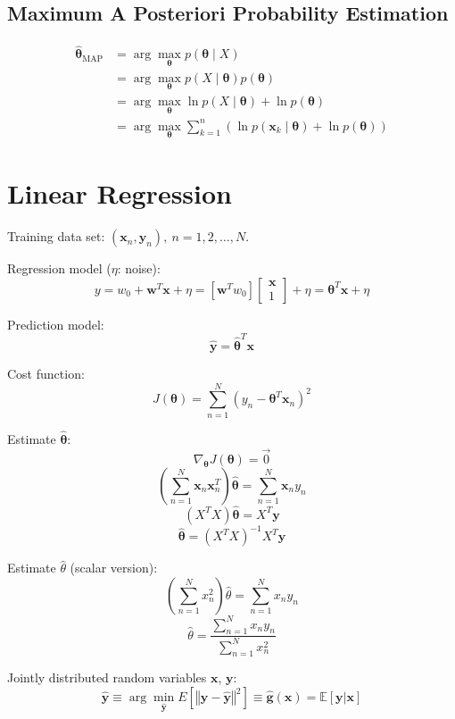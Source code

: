 \documentclass{article}
\begin{document}
\begin{multicols}{2}
\subsection{Maximum A Posteriori Probability Estimation}

\[\begin{split}
	\symbf{\hat \theta}_{\text{MAP}} &= \arg\max_{\symbf{\theta}} p(\symbf{\theta} \mid X) \\
	&= \arg\max_{\symbf{\theta}} p(X \mid \symbf{\theta}) p(\symbf{\theta}) \\
	&= \arg\max_{\symbf{\theta}} \ln p(X \mid \symbf{\theta}) + \ln p(\symbf{\theta}) \\
	&= \arg\max_{\symbf{\theta}} \sum_{k=1}^n \left( \ln p(\symbf{x}_k \mid \symbf{\theta}) + \ln p(\symbf{\theta}) \right)
\end{split}\]


\section{Linear Regression}

Training data set: $(\symbf{x}_n, \symbf{y}_n),\ n=1, 2, \ldots, N$.

Regression model ($\eta$: noise):
\[y = w_0 + \symbf{w}^T \symbf{x} + \eta = [\symbf{w}^T w_0] \begin{bmatrix}\symbf{x} \\
1\end{bmatrix} + \eta = \symbf{\theta}^T \symbf{x} + \eta\]

Prediction model:
\[\symbf{\hat y} = \symbf{\hat \theta}^T \symbf{x}\]

Cost function:
\[J(\symbf{\theta}) = \sum_{n=1}^N (y_n - \symbf{\theta}^T \symbf{x}_n)^2 \]

Estimate $\symbf{\hat \theta}$:
\[\nabla_{\symbf{\theta}} J(\symbf{\theta}) = \vec{0}\]
\[\left( \sum_{n=1}^N \symbf{x}_n\symbf{x}_n^T \right) \symbf{\hat \theta} = \sum_{n=1}^N \symbf{x}_n y_n\]
\[(X^T X) \symbf{\hat \theta} = X^T \symbf{y}\]
\[\symbf{\hat \theta} = (X^T X)^{-1} X^T \symbf{y}\]

Estimate $\hat \theta$ (scalar version):
\[\left( \sum_{n=1}^N x_n^2 \right) \hat \theta = \sum_{n=1}^N x_n y_n\]
\[\hat \theta = \frac{\sum_{n=1}^N x_n y_n}{\sum_{n=1}^N x_n^2}\]

Jointly distributed random variables $\symbf{x}$, $\symbf{y}$:
\[\symbf{\hat y} \equiv \arg\min_{\symbf{\hat y}} E\left[ \left\Vert \symbf{y} - \symbf{\hat y} \right\Vert^2 \right] \equiv \symbf{\hat g}(\symbf{x}) = \mathbb{E}[\symbf{y} | \symbf{x}]\]



\end{multicols}
\end{document}
